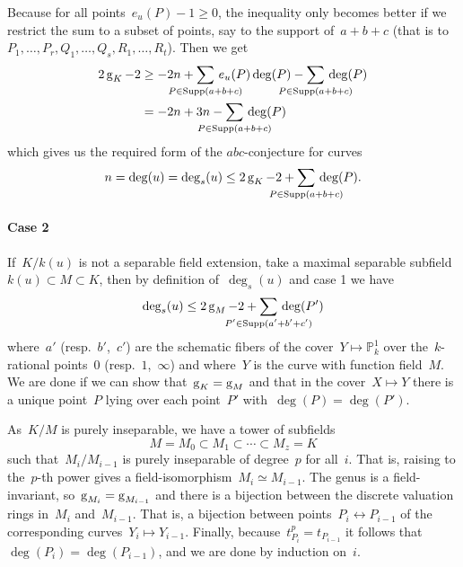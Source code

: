 Because for all points~$e_u(P)-1 \geq 0$, the inequality only becomes better if we restrict the sum to a subset of points, say to the support of~$a+b+c$ (that is to~$P_1,\ldots,P_r,Q_1,\ldots,Q_s,R_1,\ldots,R_t$). Then we get
\begin{equation}
  \begin{aligned}
    2 \genus_K -2 &\geq -2n + \sum_{\mathclap{P \in \Supp(a+b+c)}}\, e_u(P)\deg(P) - \sum_{\mathclap{P \in \Supp(a+b+c)}}\,\deg(P) \\
    &= -2n+3n-\sum_{\mathclap{P \in \Supp(a+b+c)}}\, \deg(P)
  \end{aligned}
\end{equation}
which gives us the required form of the $abc$-conjecture for curves
\begin{equation}
  n=\deg(u)=\deg_s(u) \leq 2\genus_K - 2 + \sum_{\mathclap{P \in \Supp(a+b+c)}}\, \deg(P).
\end{equation}

\paragraph{Case 2} If~$K/k(u)$ is not a separable field extension, take a maximal separable subfield~$k(u) \subset M \subset K$, then by definition of~$\deg_s(u)$ and case 1 we have
\begin{equation}
  \deg_s(u) \leq 2\genus_M - 2 + \sum_{\mathclap{P' \in \Supp(a'+b'+c')}}\, \deg(P')
\end{equation}
where~$a'$ (resp.~$b'$,~$c'$) are the schematic fibers of the cover~$Y \mapsto \mathbb{P}^1_k$ over the~$k$-rational points~$0$ (resp.~$1$,~$\infty$) and where~$Y$ is the curve with function field~$M$. We are done if we can show that~$\operatorname{g}_K=\operatorname{g}_M$ and that in the cover~$X \mapsto Y$ there is a unique point~$P$ lying over each point~$P'$ with~$\deg(P)=\deg(P')$.

As~$K/M$ is purely inseparable, we have a tower of subfields 
\begin{equation}
  M=M_0 \subset M_1 \subset \cdots \subset M_z=K
\end{equation}
such that~$M_i / M_{i-1}$ is purely inseparable of degree~$p$ for all~$i$. That is, raising to the~$p$-th power gives a field-isomorphism~$M_i \simeq M_{i-1}$. The genus is a field-invariant, so~$\operatorname{g}_{M_i}=\operatorname{g}_{M_{i-1}}$ and there is a bijection between the discrete valuation rings in~$M_i$ and~$M_{i-1}$. That is, a bijection between points~$P_i \leftrightarrow P_{i-1}$ of the corresponding curves~$Y_i \mapsto Y_{i-1}$. Finally, because~$t_{P_i}^p = t_{P_{i-1}}$ it follows that~$\deg(P_i)=\deg(P_{i-1})$, and we are done by induction on~$i$.
